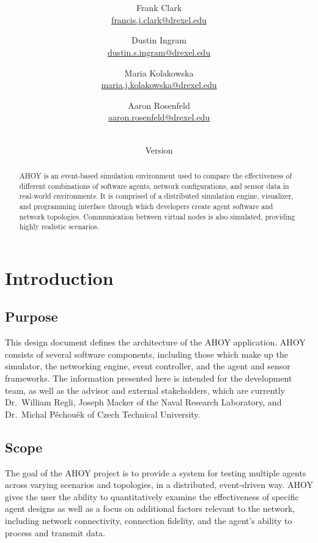\documentclass[titlepage]{article}
\title{\textbf{\mytitle}}
\author{
	Frank Clark \\\url{francis.j.clark@drexel.edu}
    \and Dustin Ingram \\\url{dustin.s.ingram@drexel.edu}
	\and Maria Kolakowska \\\url{maria.j.kolakowska@drexel.edu}
    \and Aaron Rosenfeld \\\url{aaron.rosenfeld@drexel.edu}
}
\date{\mydate\\Version \myversion}
\begin{document}

\begin{figure}
    \centering
    \scalebox{0.8}{}
    \vspace{-4em}
\end{figure}

\maketitle

\begin{abstract}
AHOY is an event-based simulation environment used to compare the effectiveness of different combinations of software agents, network configurations, and sensor data in real-world environments.  It is comprised of a distributed simulation engine, visualizer, and programming interface through which developers create agent software and network topologies.  Communication between virtual nodes is also simulated, providing highly realistic scenarios.
\end{abstract}

\setcounter{tocdepth}{4}
\tableofcontents
\pagebreak
\listoffigures
\pagebreak
{}

\section{Introduction}
\subsection{Purpose}
This design document defines the architecture of the AHOY application. AHOY consists of several software components, including those which make up the simulator, the networking engine, event controller, and the agent and sensor frameworks. The information presented here is intended for the development team, as well as the advisor and external stakeholders, which are currently Dr.~William Regli, Joseph Macker of the Naval Research Laboratory, and Dr.~Michal P\v{e}chou\v{e}k of Czech Technical University. 

\subsection{Scope}
The goal of the AHOY project is to provide a system for testing multiple agents across varying scenarios and topologies, in a distributed, event-driven way. AHOY gives the user the ability to quantitatively examine the effectiveness of specific agent designs as well as a focus on additional factors relevant to the network, including network connectivity, connection fidelity, and the agent's ability to process and transmit data.
\end{document}

